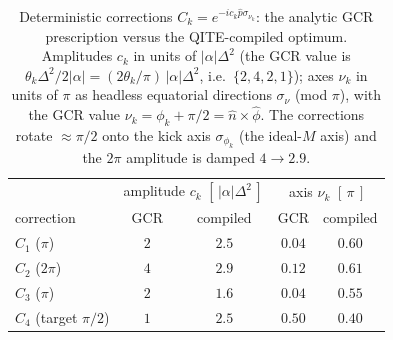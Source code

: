 \documentclass[11pt]{article}
\begin{document}
\begin{table}[h]
\centering
\begin{tabular}{lcccc}
\toprule
 & \multicolumn{2}{c}{amplitude $c_k$ $[\,|\alpha|\Delta^2\,]$} & \multicolumn{2}{c}{axis $\nu_k$ $[\,\pi\,]$}\\
correction & GCR & compiled & GCR & compiled\\
\midrule
$C_1$ ($\pi$)          & $2$ & $2.5$ & $0.04$ & $0.60$\\
$C_2$ ($2\pi$)         & $4$ & $2.9$ & $0.12$ & $0.61$\\
$C_3$ ($\pi$)          & $2$ & $1.6$ & $0.04$ & $0.55$\\
$C_4$ (target $\pi/2$) & $1$ & $2.5$ & $0.50$ & $0.40$\\
\bottomrule
\end{tabular}
\caption{Deterministic corrections $C_k=e^{-ic_k\hat p\sigma_{\nu_k}}$: the analytic GCR prescription
versus the QITE-compiled optimum. Amplitudes $c_k$ in units of $|\alpha|\Delta^2$ (the GCR value is
$\theta_k\Delta^2/2|\alpha|=(2\theta_k/\pi)\,|\alpha|\Delta^2$, i.e.\ $\{2,4,2,1\}$); axes $\nu_k$ in
units of $\pi$ as headless equatorial directions $\sigma_\nu$ (mod $\pi$), with the GCR value
$\nu_k=\phi_k+\pi/2=\hat n\times\hat\phi$. The corrections rotate $\approx\pi/2$ onto the kick axis
$\sigma_{\phi_k}$ (the ideal-$M$ axis) and the $2\pi$ amplitude is damped $4\!\to\!2.9$.}
\label{tab:qite}
\end{table}
\end{document}
